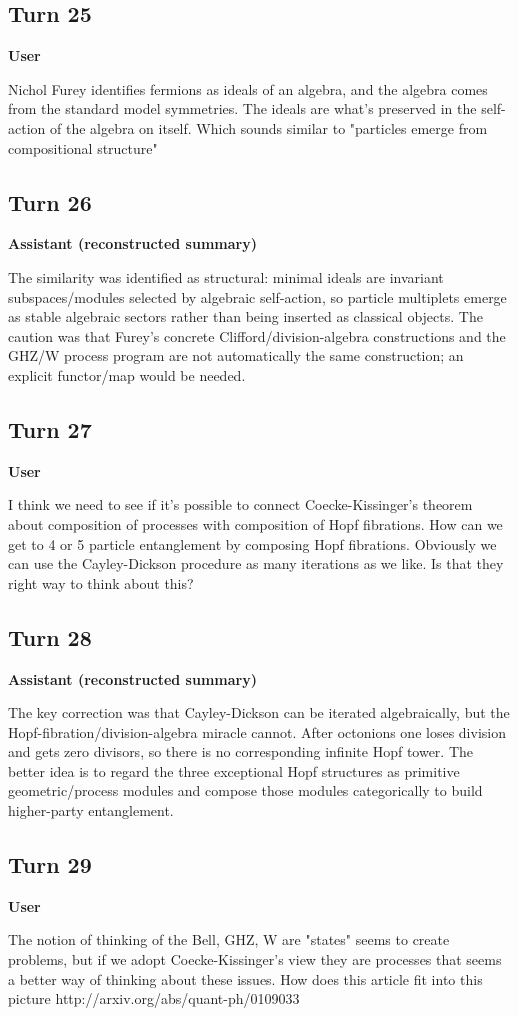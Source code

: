 \documentclass[11pt,a4paper]{article}
\newcommand{\speaker}[1]{\par\medskip\noindent\textbf{\large #1}\par\smallskip}
\begin{document}
\subsection*{Turn 25}
\speaker{User}
Nichol Furey identifies fermions as ideals of an algebra, and the algebra comes from the standard model symmetries. The ideals are what's preserved in the self-action of the algebra on itself. Which sounds similar to "particles emerge from compositional structure"
\subsection*{Turn 26}
\speaker{Assistant (reconstructed summary)}
The similarity was identified as structural: minimal ideals are invariant subspaces/modules selected by algebraic self-action, so particle multiplets emerge as stable algebraic sectors rather than being inserted as classical objects. The caution was that Furey's concrete Clifford/division-algebra constructions and the GHZ/W process program are not automatically the same construction; an explicit functor/map would be needed.
\subsection*{Turn 27}
\speaker{User}
I think we need to see if it's possible to connect Coecke-Kissinger's theorem about composition of processes with composition of Hopf fibrations. How can we get to 4 or 5 particle entanglement by composing Hopf fibrations. Obviously we can use the Cayley-Dickson procedure as many iterations as we like. Is that they right way to think about this?
\subsection*{Turn 28}
\speaker{Assistant (reconstructed summary)}
The key correction was that Cayley-Dickson can be iterated algebraically, but the Hopf-fibration/division-algebra miracle cannot. After octonions one loses division and gets zero divisors, so there is no corresponding infinite Hopf tower. The better idea is to regard the three exceptional Hopf structures as primitive geometric/process modules and compose those modules categorically to build higher-party entanglement.
\subsection*{Turn 29}
\speaker{User}
The notion of thinking of the Bell, GHZ, W are "states" seems to create problems, but if we adopt Coecke-Kissinger's view they are processes that seems a better way of thinking about these issues. How does this article fit into this picture http://arxiv.org/abs/quant-ph/0109033
\end{document}
